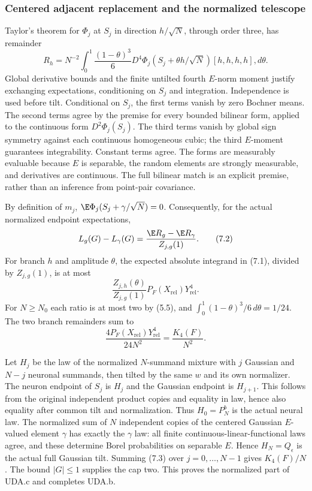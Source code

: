 \subsubsection{Centered adjacent replacement and the normalized telescope}
Taylor's theorem for $\Phi_j$ at $S_j$ in direction $h/\sqrt N$, through
order three, has remainder
\begin{equation}
 R_h=N^{-2}\int_0^1\frac{(1-\theta)^3}{6}
 D^4\Phi_j(S_j+\theta h/\sqrt N)[h,h,h,h],d\theta.\tag{7.1}
\end{equation}
Global derivative bounds and the finite untilted fourth $E$-norm moment
justify exchanging expectations, conditioning on $S_j$ and integration.
Independence is used before tilt. Conditional on $S_j$, the first terms
vanish by zero Bochner means. The second terms agree by the premise for
every bounded bilinear form, applied to the continuous form
$D^2\Phi_j(S_j)$. The third terms vanish by global sign symmetry against
each continuous homogeneous cubic; the third $E$-moment guarantees
integrability. Constant terms agree. The forms are measurably evaluable
because $E$ is separable, the random elements are strongly measurable,
and derivatives are continuous. The full bilinear match is an explicit
premise, rather than an inference from point-pair covariance.

By definition of $m_j$, $\E\Phi_j(S_j+\gamma/\sqrt N)=0$.
Consequently, for the actual normalized endpoint expectations,
\begin{equation}
 L_g(G)-L_\gamma(G)=\frac{\E R_g-\E R_\gamma}{Z_{j,g}(1)}.\tag{7.2}
\end{equation}
For branch $h$ and amplitude $\theta$, the expected absolute integrand
in (7.1), divided by $Z_{j,g}(1)$, is at most
\[
 \frac{Z_{j,h}(\theta)}{Z_{j,g}(1)}P_F(X_{\mathrm{rel}})Y_{\mathrm{rel}}^4.
\]
For $N\ge N_0$ each ratio is at most two by (5.5), and
$\int_0^1(1-\theta)^3/6\,d\theta=1/24$. The two branch remainders sum to
\begin{equation}
 \frac{4P_F(X_{\mathrm{rel}})Y_{\mathrm{rel}}^4}{24N^2}
 =\frac{K_4(F)}{N^2}.\tag{7.3}
\end{equation}

Let $H_j$ be the law of the normalized $N$-summand mixture with $j$
Gaussian and $N-j$ neuronal summands, then tilted by the same $w$ and
its own normalizer. The neuron endpoint of $S_j$ is $H_j$ and the
Gaussian endpoint is $H_{j+1}$. This follows from the original independent
product copies and equality in law, hence also equality after common tilt
and normalization. Thus $H_0=P_N^b$ is the actual neural law. The normalized
sum of $N$ independent copies of the centered Gaussian $E$-valued element
$\gamma$ has exactly the $\gamma$ law: all finite continuous-linear-functional
laws agree, and these determine Borel probabilities on separable $E$.
Hence $H_N=Q_\epsilon$ is the actual full Gaussian tilt. Summing (7.3)
over $j=0,\ldots,N-1$ gives $K_4(F)/N$. The bound $|G|\le1$ supplies
the cap two. This proves the normalized part of UDA.c and completes UDA.b.


